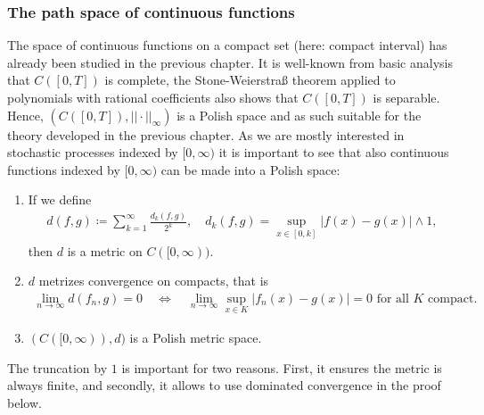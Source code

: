\subsubsection{The path space of continuous functions}
The space of continuous functions on a compact set (here: compact interval) has already been studied in the previous chapter. It is well-known from basic analysis that $C([0,T])$ is complete, the Stone-Weierstra\ss{} theorem applied to polynomials with rational coefficients also shows that $C([0,T])$ is separable. Hence, $(C([0,T]), ||\cdot ||_\infty)$ is a Polish space and as such suitable for the theory developed in the previous chapter. As we are mostly interested in stochastic processes indexed by $[0,\infty)$ it is important to see that also continuous functions indexed by $[0,\infty)$ can be made into a Polish space:
\begin{llemma}
\begin{prop}
	\begin{enumerate}[label=(\roman*)]
		\item If we define
			\begin{align*}
				d(f,g)\coloneqq \sum_{k=1}^{\infty} \frac{d_k(f,g)}{2^k},\quad d_k(f,g) = \sup_{x\in [0,k]} \lvert f(x) - g(x)\rvert \wedge 1,
			\end{align*}
		then $d$ is a metric on $C([0,\infty))$. 
		\item $d$ metrizes convergence on compacts, that is
		\begin{align*}
			\lim_{n\to\infty} d(f_n,g)=0\quad \Leftrightarrow \quad \lim_{n\to\infty}\sup_{x\in K}|f_n(x)-g(x)|=0\text{ for all }K\text{ compact.}
		\end{align*}
		\item $( C([0,\infty)),d )$ is a Polish metric space.
	\end{enumerate}
\end{prop}
\end{llemma}
The truncation by $1$ is important for two reasons. First, it ensures the metric is always finite, and secondly, it allows to use dominated convergence in the proof below.
